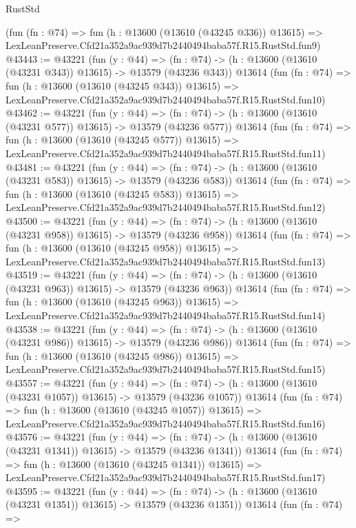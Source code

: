 \begin{lexlean}{RustStd}
\begin{coremodule}
    (fun (fn : @74) =>
    fun (h : @13600 (@13610 (@43245 @336)) @13615) =>
    LexLeanPreserve.Cfd21a352a9ac939d7b2440494baba57f.R15.RustStd.fun9)
@43443 := @43221
    (fun (y : @44) =>
    (fn : @74) -> (h : @13600 (@13610 (@43231 @343)) @13615) -> @13579 (@43236 @343))
    @13614
    (fun (fn : @74) =>
    fun (h : @13600 (@13610 (@43245 @343)) @13615) =>
    LexLeanPreserve.Cfd21a352a9ac939d7b2440494baba57f.R15.RustStd.fun10)
@43462 := @43221
    (fun (y : @44) =>
    (fn : @74) -> (h : @13600 (@13610 (@43231 @577)) @13615) -> @13579 (@43236 @577))
    @13614
    (fun (fn : @74) =>
    fun (h : @13600 (@13610 (@43245 @577)) @13615) =>
    LexLeanPreserve.Cfd21a352a9ac939d7b2440494baba57f.R15.RustStd.fun11)
@43481 := @43221
    (fun (y : @44) =>
    (fn : @74) -> (h : @13600 (@13610 (@43231 @583)) @13615) -> @13579 (@43236 @583))
    @13614
    (fun (fn : @74) =>
    fun (h : @13600 (@13610 (@43245 @583)) @13615) =>
    LexLeanPreserve.Cfd21a352a9ac939d7b2440494baba57f.R15.RustStd.fun12)
@43500 := @43221
    (fun (y : @44) =>
    (fn : @74) -> (h : @13600 (@13610 (@43231 @958)) @13615) -> @13579 (@43236 @958))
    @13614
    (fun (fn : @74) =>
    fun (h : @13600 (@13610 (@43245 @958)) @13615) =>
    LexLeanPreserve.Cfd21a352a9ac939d7b2440494baba57f.R15.RustStd.fun13)
@43519 := @43221
    (fun (y : @44) =>
    (fn : @74) -> (h : @13600 (@13610 (@43231 @963)) @13615) -> @13579 (@43236 @963))
    @13614
    (fun (fn : @74) =>
    fun (h : @13600 (@13610 (@43245 @963)) @13615) =>
    LexLeanPreserve.Cfd21a352a9ac939d7b2440494baba57f.R15.RustStd.fun14)
@43538 := @43221
    (fun (y : @44) =>
    (fn : @74) -> (h : @13600 (@13610 (@43231 @986)) @13615) -> @13579 (@43236 @986))
    @13614
    (fun (fn : @74) =>
    fun (h : @13600 (@13610 (@43245 @986)) @13615) =>
    LexLeanPreserve.Cfd21a352a9ac939d7b2440494baba57f.R15.RustStd.fun15)
@43557 := @43221
    (fun (y : @44) =>
    (fn : @74) -> (h : @13600 (@13610 (@43231 @1057)) @13615) -> @13579 (@43236 @1057))
    @13614
    (fun (fn : @74) =>
    fun (h : @13600 (@13610 (@43245 @1057)) @13615) =>
    LexLeanPreserve.Cfd21a352a9ac939d7b2440494baba57f.R15.RustStd.fun16)
@43576 := @43221
    (fun (y : @44) =>
    (fn : @74) -> (h : @13600 (@13610 (@43231 @1341)) @13615) -> @13579 (@43236 @1341))
    @13614
    (fun (fn : @74) =>
    fun (h : @13600 (@13610 (@43245 @1341)) @13615) =>
    LexLeanPreserve.Cfd21a352a9ac939d7b2440494baba57f.R15.RustStd.fun17)
@43595 := @43221
    (fun (y : @44) =>
    (fn : @74) -> (h : @13600 (@13610 (@43231 @1351)) @13615) -> @13579 (@43236 @1351))
    @13614
    (fun (fn : @74) =>

\end{coremodule}
\end{lexlean}
